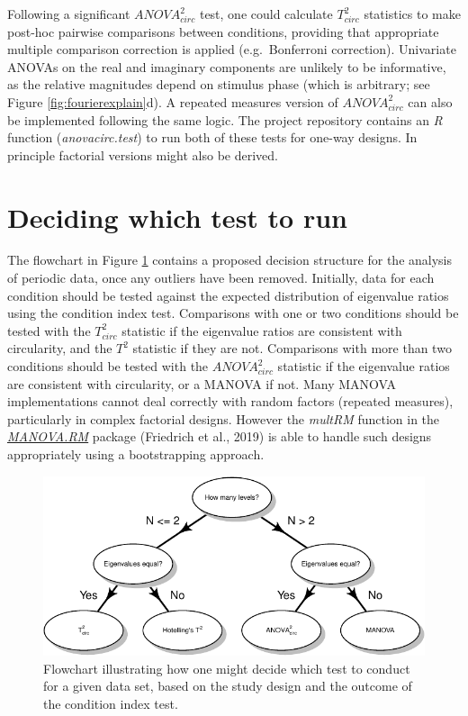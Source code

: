 \documentclass[]{article}
\begin{document}
Following a significant \({ANOVA}^2_{circ}\) test, one could calculate \(T^2_{circ}\) statistics to make post-hoc pairwise comparisons between conditions, providing that appropriate multiple comparison correction is applied (e.g.~Bonferroni correction). Univariate ANOVAs on the real and imaginary components are unlikely to be informative, as the relative magnitudes depend on stimulus phase (which is arbitrary; see Figure \ref{fig:fourierexplain}d). A repeated measures version of \({ANOVA}^2_{circ}\) can also be implemented following the same logic. The project repository contains an \emph{R} function (\emph{anovacirc.test}) to run both of these tests for one-way designs. In principle factorial versions might also be derived.

\hypertarget{deciding-which-test-to-run}{%
\section{Deciding which test to run}\label{deciding-which-test-to-run}}

The flowchart in Figure \ref{fig:flowchart} contains a proposed decision structure for the analysis of periodic data, once any outliers have been removed. Initially, data for each condition should be tested against the expected distribution of eigenvalue ratios using the condition index test. Comparisons with one or two conditions should be tested with the \(T^2_{circ}\) statistic if the eigenvalue ratios are consistent with circularity, and the \(T^2\) statistic if they are not. Comparisons with more than two conditions should be tested with the \(ANOVA^2_{circ}\) statistic if the eigenvalue ratios are consistent with circularity, or a MANOVA if not. Many MANOVA implementations cannot deal correctly with random factors (repeated measures), particularly in complex factorial designs. However the \emph{multRM} function in the \href{https://CRAN.R-project.org/package=MANOVA.RM}{\emph{MANOVA.RM}} package (Friedrich et al., 2019) is able to handle such designs appropriately using a bootstrapping approach.

\begin{figure}

{\centering \includegraphics{manuscript_files/figure-latex/flowchart-1} 

}

\caption{Flowchart illustrating how one might decide which test to conduct for a given data set, based on the study design and the outcome of the condition index test.}\label{fig:flowchart}
\end{figure}
\end{document}
